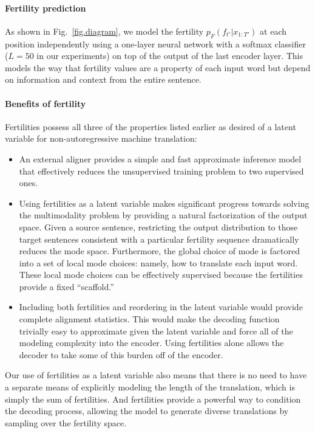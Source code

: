 \vspace{-5pt}
\paragraph{Fertility prediction} As shown in Fig.~\ref{fig.diagram}, we model the fertility $p_F(f_{t'}|x_{1:T'})$ at each position independently using a one-layer neural network with a softmax classifier ($L=50$ in our experiments) on top of the output of the last encoder layer. This models the way that fertility values are a property of each input word but depend on information and context from the entire sentence.

\vspace{-5pt}
\paragraph{Benefits of fertility} 
Fertilities possess all three of the properties listed earlier as desired of a latent variable for non-autoregressive machine translation:
\begin{itemize}[leftmargin=*]
\item An external aligner provides a simple and fast approximate inference model that effectively reduces the unsupervised training problem to two supervised ones.
\item Using fertilities as a latent variable makes significant progress towards solving the multimodality problem by providing a natural factorization of the output space.
Given a source sentence, restricting the output distribution to those target sentences consistent with a particular fertility sequence dramatically reduces the mode space. Furthermore, the global choice of mode is factored into a set of local mode choices: namely, how to translate each input word. These local mode choices can be effectively supervised because the fertilities provide a fixed ``scaffold.''
\item Including both fertilities and reordering in the latent variable would provide complete alignment statistics. This would make the decoding function trivially easy to approximate given the latent variable and force all of the modeling complexity into the encoder. Using fertilities alone allows the decoder to take some of this burden off of the encoder.
\end{itemize}
Our use of fertilities as a latent variable also means that there is no need to have a separate means of explicitly modeling the length of the translation, which is simply the sum of fertilities.
And fertilities provide a powerful way to condition the decoding process, allowing the model to generate diverse translations by sampling over the fertility space.

